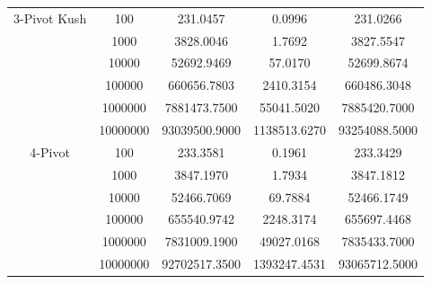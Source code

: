 \documentclass[a4paper,oneside,12pt]{book}
\begin{document}
\begin{center}
    \small
    \begin{tabular}{ |c c | c c c| }
        \hline
        3-Pivot Kush    & 100      & 231.0457       & 0.0996        & 231.0266 \\
                        & 1000     & 3828.0046      & 1.7692        & 3827.5547 \\
                        & 10000    & 52692.9469     & 57.0170       & 52699.8674 \\
                        & 100000   & 660656.7803    & 2410.3154     & 660486.3048 \\
                        & 1000000  & 7881473.7500   & 55041.5020    & 7885420.7000 \\
                        & 10000000 & 93039500.9000  & 1138513.6270  & 93254088.5000 \\
        \hline
        4-Pivot         & 100      & 233.3581       & 0.1961        & 233.3429 \\
                        & 1000     & 3847.1970      & 1.7934        & 3847.1812 \\
                        & 10000    & 52466.7069     & 69.7884       & 52466.1749 \\
                        & 100000   & 655540.9742    & 2248.3174     & 655697.4468 \\
                        & 1000000  & 7831009.1900   & 49027.0168    & 7835433.7000 \\
                        & 10000000 & 92702517.3500  & 1393247.4531  & 93065712.5000 \\
        \hline
    \end{tabular}


\end{center}
\end{document}
